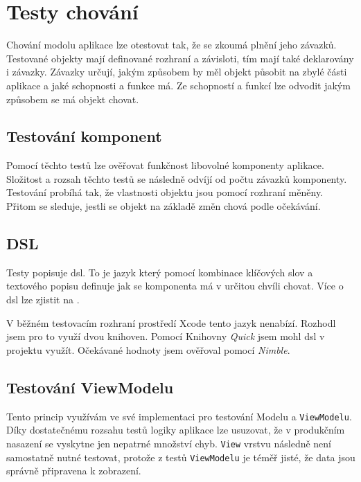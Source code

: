 \section{Testy chování}\label{testovani-bdd}

Chování modolu aplikace lze otestovat tak, že se zkoumá plnění jeho závazků.
Testované objekty mají definované rozhraní a závisloti, tím mají také deklarovány i závazky.
Závazky určují, jakým způsobem by měl objekt působit na zbylé části aplikace a jaké schopnosti a funkce má.
Ze schopností a funkcí lze odvodit jakým způsobem se má objekt chovat.

\subsection{Testování komponent}

Pomocí těchto testů lze ověřovat funkčnost libovolné komponenty aplikace.
Složitost a rozsah těchto testů se následně odvíjí od počtu závazků komponenty.
Testování probíhá tak, že vlastnosti objektu jsou pomocí rozhraní měněny.
Přitom se sleduje, jestli se objekt na základě změn chová podle očekávání. \cite{objcio-bdd}

\subsection{DSL}

Testy popisuje \acrfull{dsl}.
To je jazyk který pomocí kombinace klíčových slov a textového popisu definuje jak se komponenta má v určitou chvíli chovat.
Více o \acrshort{dsl} lze zjistit na \cite{petrikainulainen-dsl}.

V běžném testovacím rozhraní prostředí Xcode tento jazyk nenabízí.
Rozhodl jsem pro to využí dvou knihoven.
Pomocí Knihovny \textit{Quick} jsem mohl \acrshort{dsl} v projektu využít.
Očekávané hodnoty jsem ověřoval pomocí \textit{Nimble}.

\subsection{Testování ViewModelu}

Tento princip využívám ve své implementaci pro testování Modelu a \texttt{ViewModelu}.
Díky dostatečnému rozsahu testů logiky aplikace lze usuzovat, že v produkčním nasazení se vyskytne jen nepatrné množství chyb.
\texttt{View} vrstvu následně není samostatně nutné testovat, protože z testů \texttt{ViewModelu} je téměř jisté, že data jsou správně připravena k zobrazení.

